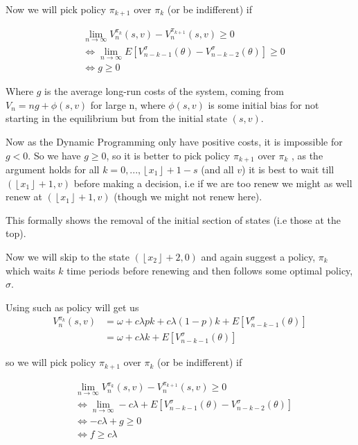 \documentclass[a4paper,10pt]{article}
\newcommand{\floor}[1]{\left \lfloor #1 \right \rfloor}
\theoremstyle{definition}
\theoremstyle{definition}
\theoremstyle{remark}
\theoremstyle{definition}
\begin{document}
Now we will pick policy $\pi_{k+1}$ over $\pi_{k}$ (or be indifferent) if

\begin{align*}
&\lim\limits_{n \rightarrow \infty} V_{n}^{\pi_{k}} (s,v) - V_{n}^{\pi_{k+1}}(s,v) \geq 0 \\
& \iff \lim\limits_{n \rightarrow \infty} E[V_{n-k-1}^{\sigma}(\theta) - V_{n-k-2}^{\sigma} (\theta)] \geq 0 \\
& \iff g \geq 0
\end{align*}

Where $g$ is the average long-run costs of the system, coming from $V_{n}=ng+\phi(s,v)$ for large n, where $\phi(s,v)$ is some initial bias for not starting in the equilibrium but from the initial state $(s,v)$.

Now as the Dynamic Programming only have positive costs, it is impossible for $g < 0$. So we have $g \geq 0 $, so it is better to pick policy $\pi_{k+1}$ over $\pi_{k}$ , as the argument holds for all $k=0,...,\floor{x_{1}}+1-s$ (and all $v$) it is best to wait till $(\floor{x_{1}}+1,v)$ before making a decision, i.e if we are too renew we might as well renew at $(\floor{x_{1}}+1,v)$ (though we might not renew here).

This formally shows the removal of the initial section of states (i.e those at the top).

Now we will skip to the state $(\floor{x_{2}}+2,0)$ and again suggest a policy, $\pi_{k}$ which waits $k$ time periods before renewing and then follows some optimal policy, $\sigma$.

Using such as policy will get us
\begin{align*}
V_{n}^{\pi_{k}}(s,v)&=\omega + c \lambda p  k + c \lambda (1-p) k + E[V_{n-k-1}^{\sigma}(\theta)] \\
&=\omega + c \lambda k + E[V_{n-k-1}^{\sigma}(\theta)] 
\end{align*}

so we will pick policy $\pi_{k+1}$ over $\pi_{k}$ (or be indifferent) if

\begin{align*}
&\lim\limits_{n \rightarrow \infty} V_{n}^{\pi_{k}}(s,v) - V_{n}^{\pi_{k+1}}(s,v) \geq 0 \\
& \iff \lim\limits_{n \rightarrow \infty} -c \lambda + E[V_{n-k-1}^{\sigma}(\theta) - V_{n-k-2}^{\sigma} (\theta)] \\
& \iff -c \lambda + g \geq 0 \\
& \iff f \geq c \lambda
\end{align*}
\end{document}
